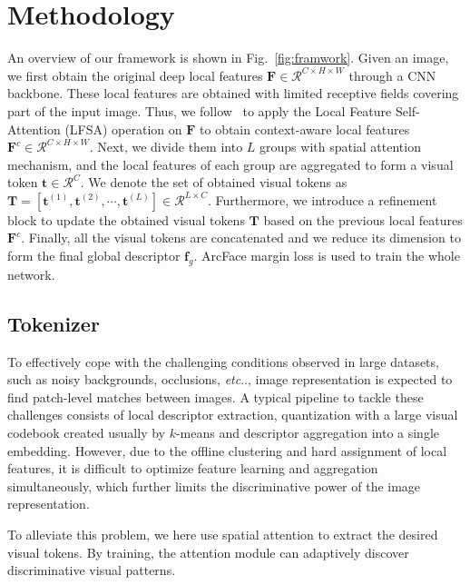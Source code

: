 \documentclass[letterpaper]{article} \usepackage{aaai22}  \usepackage{times}  \usepackage{helvet}  \usepackage{courier}  \usepackage[hyphens]{url}  \usepackage{graphicx} \urlstyle{rm} \def\UrlFont{\rm}  \usepackage{natbib}  \usepackage{caption} \DeclareCaptionStyle{ruled}{labelfont=normalfont,labelsep=colon,strut=off} \frenchspacing  \setlength{\pdfpagewidth}{8.5in}  \setlength{\pdfpageheight}{11in}  \usepackage{algorithm}
\makeatletter
\DeclareRobustCommand\onedot{\futurelet\@let@token\@onedot}
\def\@onedot{\ifx\@let@token.\else.\null\fi\xspace}
\def\etc{\emph{etc}\onedot} \def\vs{\emph{vs}\onedot}
\makeatother
\begin{document}
\section{Methodology} \label{sec:Methodology}
An overview of our framework is shown in Fig.~\ref{fig:framwork}. 
Given an image, we first obtain the original deep local features $\bm{F} \in \mathcal{R}^{C \times H \times W}$ through a CNN backbone. 
These local features are obtained with limited receptive fields covering part of the input image. 
Thus, we follow~\cite{ng2020solar} to apply the Local Feature Self-Attention (LFSA) operation on $\bm{F}$ to obtain context-aware local features $\bm{F}^c \in \mathcal{R}^{C \times H \times W} $. 
Next, we divide them into $L$ groups with spatial attention mechanism, and the local features of each group are aggregated to form a visual token $\bm{t} \in \mathcal{R}^{C}$. 
We denote the set of obtained visual tokens as $\bm{T} = \left[\bm{t}^{(1)},\bm{t}^{(2)},\cdots,\bm{t}^{(L)} \right] \in \mathcal{R}^{L \times C}$.
Furthermore, we introduce a refinement block to update the obtained visual tokens $\bm{T}$ based on the previous local features $\bm{F}^c$.
Finally, all the visual tokens are concatenated and we reduce its dimension to form the final global descriptor $\bm{f}_{g}$. ArcFace margin loss is used to train the whole network.
	
\subsection{Tokenizer}
To effectively cope with the challenging conditions observed in large datasets, such as noisy backgrounds, occlusions, \etc, image representation is expected to find patch-level matches between images.
A typical pipeline to tackle these challenges consists of local descriptor extraction, quantization with a large visual codebook created usually by $k$-means and descriptor aggregation into a single embedding.
However, due to the offline clustering and hard assignment of local features, it is difficult to optimize feature learning and aggregation simultaneously, which further limits the discriminative power of the image representation.

To alleviate this problem, we here use spatial attention to extract the desired visual tokens.
By training, the attention module can adaptively discover discriminative visual patterns.
\end{document}
